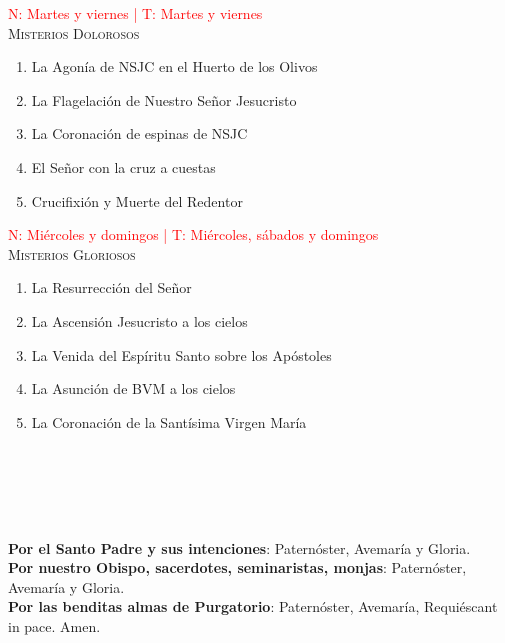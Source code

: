 \documentclass[9pt]{article}
\begin{document}
\begin{multicols*}{2}
    \small{\textcolor{red}{N: Martes y viernes | T: Martes y viernes}}\\
    \textsc{Misterios Dolorosos}
    \begin{enumerate}
        \item La Agonía de NSJC en el Huerto de los Olivos
        \item La Flagelación de Nuestro Señor Jesucristo
        \item La Coronación de espinas de NSJC
        \item El Señor con la cruz a cuestas
        \item Crucifixión y Muerte del Redentor
    \end{enumerate}

    \vspace{2mm}

    \small{\textcolor{red}{N: Miércoles y domingos | T: Miércoles, sábados y domingos}}\\
    \textsc{Misterios Gloriosos}
    \begin{enumerate}
        \item La Resurrección del Señor
        \item La Ascensión Jesucristo a los cielos
        \item La Venida del Espíritu Santo sobre los Apóstoles
        \item La Asunción de BVM a los cielos
        \item La Coronación de la Santísima Virgen María
    \end{enumerate}

    \vspace{2mm}

    \\[1mm]
    \\[1mm]
    \\[1mm]
    

    \vspace{2mm}

    \\

    \textbf{Por el Santo Padre y sus intenciones}: Paternóster, Avemaría y Gloria.\\[1mm]
    \textbf{Por nuestro Obispo, sacerdotes, seminaristas, monjas}: Paternóster, Avemaría y Gloria.\\[1mm]
    \textbf{Por las benditas almas de Purgatorio}: Paternóster, Avemaría, Requiéscant in pace. Amen.\\


\end{multicols*}
\end{document}
